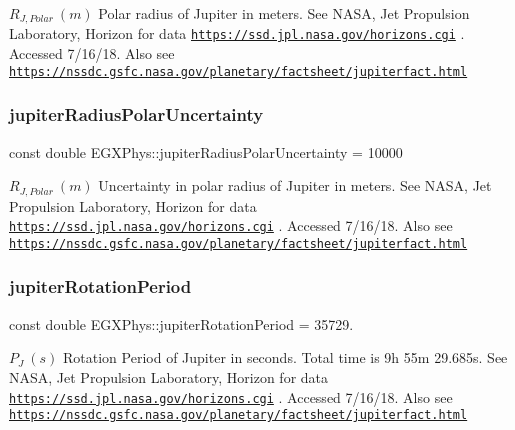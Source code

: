 $R_{J,Polar} \ (m)$ Polar radius of Jupiter in meters. See N\+A\+SA, Jet Propulsion Laboratory, Horizon for data \href{https://ssd.jpl.nasa.gov/horizons.cgi}{\tt https\+://ssd.\+jpl.\+nasa.\+gov/horizons.\+cgi} . Accessed 7/16/18. Also see \href{https://nssdc.gsfc.nasa.gov/planetary/factsheet/jupiterfact.html}{\tt https\+://nssdc.\+gsfc.\+nasa.\+gov/planetary/factsheet/jupiterfact.\+html} \mbox{\label{namespace_e_g_x_phys_a0340e326f1ae054e922ba82da4ee4b25}} 
\subsubsection{\texorpdfstring{jupiter\+Radius\+Polar\+Uncertainty}{jupiterRadiusPolarUncertainty}}
{\footnotesize\ttfamily const double E\+G\+X\+Phys\+::jupiter\+Radius\+Polar\+Uncertainty = 10000}

$R_{J,Polar} \ (m)$ Uncertainty in polar radius of Jupiter in meters. See N\+A\+SA, Jet Propulsion Laboratory, Horizon for data \href{https://ssd.jpl.nasa.gov/horizons.cgi}{\tt https\+://ssd.\+jpl.\+nasa.\+gov/horizons.\+cgi} . Accessed 7/16/18. Also see \href{https://nssdc.gsfc.nasa.gov/planetary/factsheet/jupiterfact.html}{\tt https\+://nssdc.\+gsfc.\+nasa.\+gov/planetary/factsheet/jupiterfact.\+html} \mbox{\label{namespace_e_g_x_phys_a21da3427de7c5f14c0c92f18d309ee21}} 
\subsubsection{\texorpdfstring{jupiter\+Rotation\+Period}{jupiterRotationPeriod}}
{\footnotesize\ttfamily const double E\+G\+X\+Phys\+::jupiter\+Rotation\+Period = 35729.}

$ P_{J} \ (s)$ Rotation Period of Jupiter in seconds. Total time is 9h 55m 29.\+685s. See N\+A\+SA, Jet Propulsion Laboratory, Horizon for data \href{https://ssd.jpl.nasa.gov/horizons.cgi}{\tt https\+://ssd.\+jpl.\+nasa.\+gov/horizons.\+cgi} . Accessed 7/16/18. Also see \href{https://nssdc.gsfc.nasa.gov/planetary/factsheet/jupiterfact.html}{\tt https\+://nssdc.\+gsfc.\+nasa.\+gov/planetary/factsheet/jupiterfact.\+html} \mbox{\label{namespace_e_g_x_phys_a29c07eaf609dbad71821837ed2660543}} 

